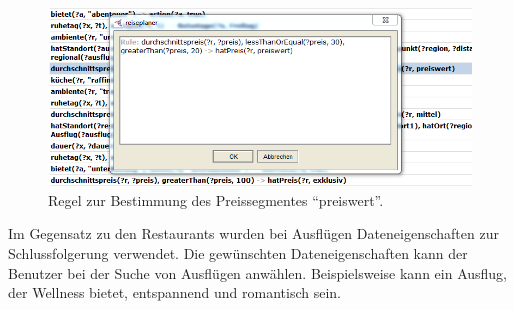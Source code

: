 \begin{figure}[H]%
    \centering
    \includegraphics[scale=0.7]{bilder/SWRLBeispiel.png}
    \caption{Regel zur Bestimmung des Preissegmentes ``preiswert''.\label{fig:loesung:regeln_bsp}\protect\footnotemark}
\end{figure}

Im Gegensatz zu den Restaurants wurden bei Ausflügen Dateneigenschaften zur Schlussfolgerung verwendet. Die gewünschten Dateneigenschaften kann der Benutzer bei der Suche von Ausflügen anwählen. Beispielsweise kann ein Ausflug, der Wellness bietet, entspannend und romantisch sein.

